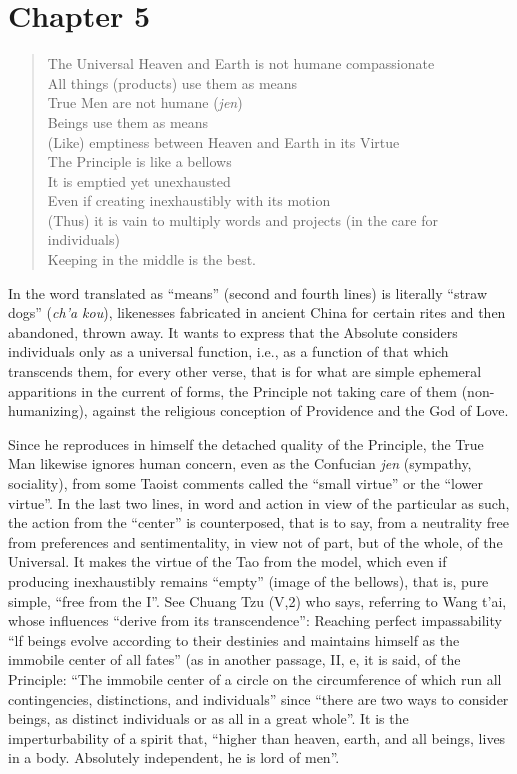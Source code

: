 \section{Chapter 5}

\begin{quotex}
\begin{verse}
The Universal Heaven and Earth is not humane compassionate \\
All things (products) use them as means\\
True Men are not humane (\emph{jen})\\
Beings use them as means\\
(Like) emptiness between Heaven and Earth in its Virtue\\
The Principle is like a bellows\\
It is emptied yet unexhausted\\
Even if creating inexhaustibly with its motion\\
(Thus) it is vain to multiply words and projects (in the care for individuals)\\
Keeping in the middle is the best.
\end{verse}
\end{quotex}

In the word translated as ``means'' (second and fourth lines) is literally ``straw dogs'' (\emph{ch'a kou}), likenesses fabricated in ancient China for certain rites and then abandoned, thrown away. It wants to express that the Absolute considers individuals only as a universal function, i.e., as a function of that which transcends them, for every other verse, that is for what are simple ephemeral apparitions in the current of forms, the Principle not taking care of them (non-humanizing), against the religious conception of Providence and the God of Love.

Since he reproduces in himself the detached quality of the Principle, the True Man likewise ignores human concern, even as the Confucian \emph{jen} (sympathy, sociality), from some Taoist comments called the ``small virtue'' or the ``lower virtue''. In the last two lines, in word and action in view of the particular as such, the action from the ``center'' is counterposed, that is to say, from a neutrality free from preferences and sentimentality, in view not of part, but of the whole, of the Universal. It makes the virtue of the Tao from the model, which even if producing inexhaustibly remains ``empty'' (image of the bellows), that is, pure simple, ``free from the I''. See Chuang Tzu (V,2) who says, referring to Wang t'ai, whose influences ``derive from its transcendence'': Reaching perfect impassability ``lf beings evolve according to their destinies and maintains himself as the immobile center of all fates'' (as in another passage, II, e, it is said, of the Principle: ``The immobile center of a circle on the circumference of which run all contingencies, distinctions, and individuals'' since ``there are two ways to consider beings, as distinct individuals or as all in a great whole''. It is the imperturbability of a spirit that, ``higher than heaven, earth, and all beings, lives in a body. Absolutely independent, he is lord of men''.

